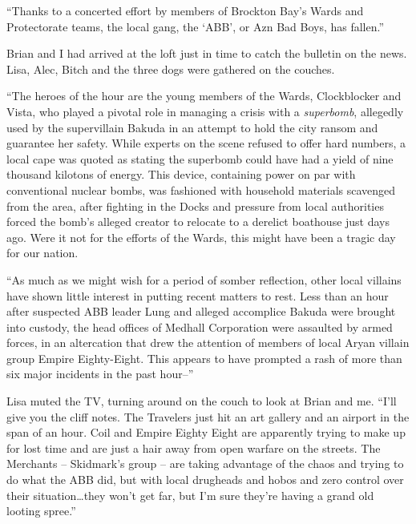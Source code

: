 





``Thanks to a concerted effort by members of Brockton Bay's Wards and Protectorate teams, the local gang, the `ABB', or Azn Bad Boys, has fallen.''



Brian and I had arrived at the loft just in time to catch the bulletin on the news.  Lisa, Alec, Bitch and the three dogs were gathered on the couches.



``The heroes of the hour are the young members of the Wards, Clockblocker and Vista, who played a pivotal role in managing a crisis with a \emph{superbomb}, allegedly used by the supervillain Bakuda in an attempt to hold the city ransom and guarantee her safety.  While experts on the scene refused to offer hard numbers, a local cape was quoted as stating the superbomb could have had a yield of nine thousand kilotons of energy.  This device, containing power on par with conventional nuclear bombs, was fashioned with household materials scavenged from the area, after fighting in the Docks and pressure from local authorities forced the bomb's alleged creator to relocate to a derelict boathouse just days ago.  Were it not for the efforts of the Wards, this might have been a tragic day for our nation.



``As much as we might wish for a period of somber reflection, other local villains have shown little interest in putting recent matters to rest.  Less than an hour after suspected ABB leader Lung and alleged accomplice Bakuda were brought into custody, the head offices of Medhall Corporation were assaulted by armed forces, in an altercation that drew the attention of members of local Aryan villain group Empire Eighty-Eight.  This appears to have prompted a rash of more than six major incidents in the past hour--''



Lisa muted the TV, turning around on the couch to look at Brian and me.  ``I'll give you the cliff notes.  The Travelers just hit an art gallery and an airport in the span of an hour.  Coil and Empire Eighty Eight are apparently trying to make up for lost time and are just a hair away from open warfare on the streets.  The Merchants – Skidmark's group – are taking advantage of the chaos and trying to do what the ABB did, but with local drugheads and hobos and zero control over their situation\ldots they won't get far, but I'm sure they're having a grand old looting spree.''



